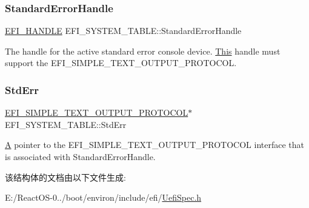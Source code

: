 \subsubsection{\texorpdfstring{Standard\+Error\+Handle}{StandardErrorHandle}}
{\footnotesize\ttfamily \hyperlink{_uefi_base_type_8h_af943d518ce8a229e7e51ce3fed0e3122}{E\+F\+I\+\_\+\+H\+A\+N\+D\+LE} E\+F\+I\+\_\+\+S\+Y\+S\+T\+E\+M\+\_\+\+T\+A\+B\+L\+E\+::\+Standard\+Error\+Handle}

The handle for the active standard error console device. \hyperlink{namespace_this}{This} handle must support the E\+F\+I\+\_\+\+S\+I\+M\+P\+L\+E\+\_\+\+T\+E\+X\+T\+\_\+\+O\+U\+T\+P\+U\+T\+\_\+\+P\+R\+O\+T\+O\+C\+OL. \mbox{\label{struct_e_f_i___s_y_s_t_e_m___t_a_b_l_e_a06e4ea7c4cbcaf05dea5fa6e3901a870}} 
\subsubsection{\texorpdfstring{Std\+Err}{StdErr}}
{\footnotesize\ttfamily \hyperlink{struct___e_f_i___s_i_m_p_l_e___t_e_x_t___o_u_t_p_u_t___p_r_o_t_o_c_o_l}{E\+F\+I\+\_\+\+S\+I\+M\+P\+L\+E\+\_\+\+T\+E\+X\+T\+\_\+\+O\+U\+T\+P\+U\+T\+\_\+\+P\+R\+O\+T\+O\+C\+OL}$\ast$ E\+F\+I\+\_\+\+S\+Y\+S\+T\+E\+M\+\_\+\+T\+A\+B\+L\+E\+::\+Std\+Err}

\hyperlink{struct_a}{A} pointer to the E\+F\+I\+\_\+\+S\+I\+M\+P\+L\+E\+\_\+\+T\+E\+X\+T\+\_\+\+O\+U\+T\+P\+U\+T\+\_\+\+P\+R\+O\+T\+O\+C\+OL interface that is associated with Standard\+Error\+Handle. 

该结构体的文档由以下文件生成\+:\begin{DoxyCompactItemize}
\item 
E\+:/\+React\+O\+S-\/0../boot/environ/include/efi/\hyperlink{_uefi_spec_8h}{Uefi\+Spec.\+h}\end{DoxyCompactItemize}
